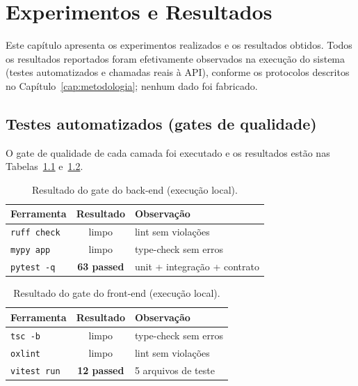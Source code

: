 \chapter{Experimentos e Resultados}
\label{cap:experimentos}

Este capítulo apresenta os experimentos realizados e os resultados obtidos.
Todos os resultados reportados foram efetivamente observados na execução do
sistema (testes automatizados e chamadas reais à API), conforme os protocolos
descritos no Capítulo~\ref{cap:metodologia}; nenhum dado foi fabricado.

\section{Testes automatizados (gates de qualidade)}

O gate de qualidade de cada camada foi executado e os resultados estão nas
Tabelas~\ref{tab:testes-backend} e~\ref{tab:testes-frontend}.

\begin{table}[htbp]
\centering
\caption{Resultado do gate do back-end (execução local).}
\label{tab:testes-backend}
\begin{tabular}{@{}lcl@{}}
\toprule
\textbf{Ferramenta} & \textbf{Resultado} & \textbf{Observação} \\
\midrule
\texttt{ruff check} & limpo & lint sem violações \\
\texttt{mypy app} & limpo & type-check sem erros \\
\texttt{pytest -q} & \textbf{63 passed} & unit + integração + contrato \\
\bottomrule
\end{tabular}
\par\vspace{2pt}{\footnotesize Fonte: execução real documentada em STATUS.md do projeto.}
\end{table}

\begin{table}[htbp]
\centering
\caption{Resultado do gate do front-end (execução local).}
\label{tab:testes-frontend}
\begin{tabular}{@{}lcl@{}}
\toprule
\textbf{Ferramenta} & \textbf{Resultado} & \textbf{Observação} \\
\midrule
\texttt{tsc -b} & limpo & type-check sem erros \\
\texttt{oxlint} & limpo & lint sem violações \\
\texttt{vitest run} & \textbf{12 passed} & 5 arquivos de teste \\
\bottomrule
\end{tabular}
\par\vspace{2pt}{\footnotesize Fonte: execução real documentada em STATUS.md do projeto.}
\end{table}

